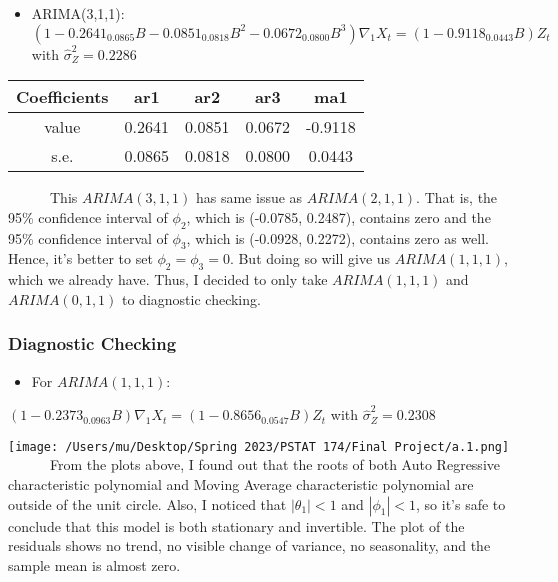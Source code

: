 \documentclass[
]{article}
\providecommand{\tightlist}{%
  \setlength{\itemsep}{0pt}\setlength{\parskip}{0pt}}
\begin{document}
\begin{itemize}
\tightlist
\item
  ARIMA(3,1,1):
  \((1-0.2641_{0.0865}B - 0.0851_{0.0818}B^2 - 0.0672_{0.0800}B^3)\nabla_1X_t = (1-0.9118_{0.0443}B)Z_t\)
  with \(\hat{\sigma}^2_Z = 0.2286\)
\end{itemize}

\begin{longtable}[]{@{}ccccc@{}}
\toprule\noalign{}
Coefficients & ar1 & ar2 & ar3 & ma1 \\
\midrule\noalign{}
\endhead
\bottomrule\noalign{}
\endlastfoot
value & 0.2641 & 0.0851 & 0.0672 & -0.9118 \\
s.e. & 0.0865 & 0.0818 & 0.0800 & 0.0443 \\
\end{longtable}

~~~~~~This \(ARIMA(3,1,1)\) has same issue as \(ARIMA(2,1,1)\). That is,
the 95\% confidence interval of \(\phi_2\), which is (-0.0785, 0.2487),
contains zero and the 95\% confidence interval of \(\phi_3\), which is
(-0.0928, 0.2272), contains zero as well. Hence, it's better to set
\(\phi_2 = \phi_3 = 0\). But doing so will give us \(ARIMA(1,1,1)\),
which we already have. Thus, I decided to only take \(ARIMA(1,1,1)\) and
\(ARIMA(0,1,1)\) to diagnostic checking.

\hypertarget{diagnostic-checking}{%
\subsubsection{Diagnostic Checking}\label{diagnostic-checking}}

\begin{itemize}
\tightlist
\item
  For \(ARIMA(1,1,1)\):
\end{itemize}

\((1-0.2373_{0.0963}B)\nabla_1X_t = (1-0.8656_{0.0547}B)Z_t\) with
\(\hat{\sigma}^2_Z = 0.2308\)

\texttt{[image: /Users/mu/Desktop/Spring 2023/PSTAT 174/Final Project/a.1.png]}\\

~~~~~~From the plots above, I found out that the roots of both Auto
Regressive characteristic polynomial and Moving Average characteristic
polynomial are outside of the unit circle. Also, I noticed that
\(|\theta_1| < 1\) and \(|\phi_1| < 1\), so it's safe to conclude that
this model is both stationary and invertible. The plot of the residuals
shows no trend, no visible change of variance, no seasonality, and the
sample mean is almost zero.
\end{document}
